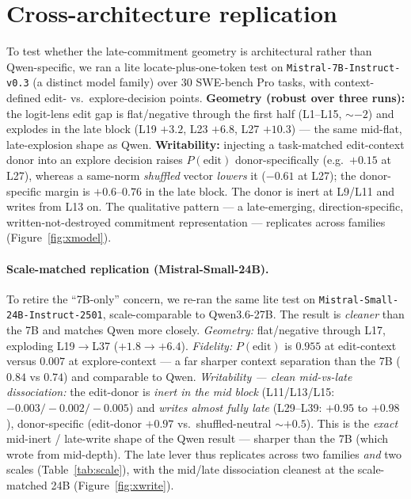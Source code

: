 \documentclass[11pt]{article}
\begin{document}
\section{Cross-architecture replication}\label{sec:xmodel}
To test whether the late-commitment geometry is architectural rather than Qwen-specific, we ran a lite
locate-plus-one-token test on \texttt{Mistral-7B-Instruct-v0.3} (a distinct model family) over 30 SWE-bench Pro
tasks, with context-defined edit- vs.\ explore-decision points. \textbf{Geometry (robust over three runs):} the
logit-lens edit gap is flat/negative through the first half (L1--L15, $\sim-2$) and explodes in the late block
(L19 $+3.2$, L23 $+6.8$, L27 $+10.3$) --- the same mid-flat, late-explosion shape as Qwen. \textbf{Writability:}
injecting a task-matched edit-context donor into an explore decision raises $P(\text{edit})$ donor-specifically
(e.g.\ $+0.15$ at L27), whereas a same-norm \emph{shuffled} vector \emph{lowers} it ($-0.61$ at L27); the
donor-specific margin is $+0.6$--$0.76$ in the late block. The donor is inert at L9/L11 and writes from L13 on.
The qualitative pattern --- a late-emerging, direction-specific, written-not-destroyed commitment
representation --- replicates across families (Figure~\ref{fig:xmodel}).

\paragraph{Scale-matched replication (Mistral-Small-24B).} To retire the ``7B-only'' concern, we re-ran the
same lite test on \texttt{Mistral-Small-24B-Instruct-2501}, scale-comparable to Qwen3.6-27B. The result is
\emph{cleaner} than the 7B and matches Qwen more closely. \emph{Geometry:} flat/negative through L17, exploding
L19$\to$L37 ($+1.8 \to +6.4$). \emph{Fidelity:} $P(\text{edit})$ is $0.955$ at edit-context versus $0.007$ at
explore-context --- a far sharper context separation than the 7B ($0.84$ vs $0.74$) and comparable to Qwen.
\emph{Writability --- clean mid-vs-late dissociation:} the edit-donor is \emph{inert in the mid block}
(L11/L13/L15: $-0.003/-0.002/-0.005$) and \emph{writes almost fully late} (L29--L39: $+0.95$ to $+0.98$),
donor-specific (edit-donor $+0.97$ vs.\ shuffled-neutral $\sim+0.5$). This is the \emph{exact} mid-inert /
late-write shape of the Qwen result --- sharper than the 7B (which wrote from mid-depth). The late lever thus
replicates across two families \emph{and} two scales (Table~\ref{tab:scale}), with the mid/late dissociation
cleanest at the scale-matched 24B (Figure~\ref{fig:xwrite}).
\end{document}

